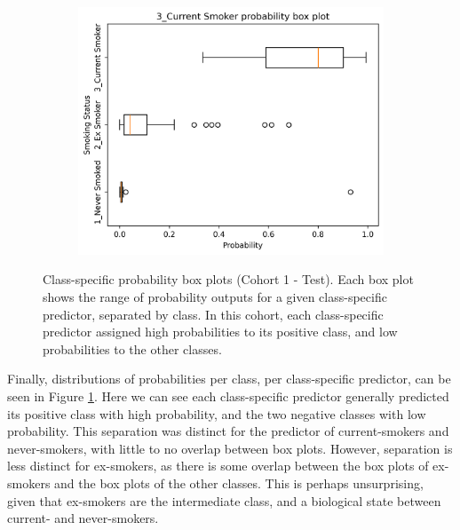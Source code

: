 \documentclass{article} %
\begin{document}
\begin{figure}[tb]
\begin{subfigure}{0.48\linewidth}
        \centering
        \includegraphics[width=\linewidth]{cohort1/test_boxplot_3.png}
    \end{subfigure}
    \caption[Class-specific probability box plots (Cohort 1 - Test)]{Class-specific probability box plots (Cohort 1 - Test). Each box plot shows the range of probability outputs for a given class-specific predictor, separated by class. In this cohort, each class-specific predictor assigned high probabilities to its positive class, and low probabilities to the other classes.}
    \label{fig:cohort1-boxplots}
\end{figure}

Finally, distributions of probabilities per class, per class-specific predictor, can be seen in Figure \ref{fig:cohort1-boxplots}. Here we can see each class-specific predictor generally predicted its positive class with high probability, and the two negative classes with low probability. This separation was distinct for the predictor of current-smokers and never-smokers, with little to no overlap between box plots. However, separation is less distinct for ex-smokers, as there is some overlap between the box plots of ex-smokers and the box plots of the other classes. This is perhaps unsurprising, given that ex-smokers are the intermediate class, and a biological state between current- and never-smokers.

\end{document}
